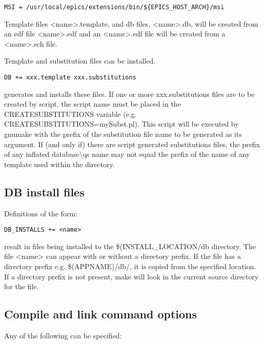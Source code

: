 \begin{verbatim}MSI = /usr/local/epics/extensions/bin/${EPICS_HOST_ARCH}/msi
\end{verbatim}
Template files \textless{}name\textgreater{}.template, and db files, \textless{}name\textgreater{}.db, will be created from an edf file \textless{}name\textgreater{}.edf and an 
\textless{}name\textgreater{}.edf file will be created from a \textless{}name\textgreater{}.sch file.

Template and substitution files can be installed.

\begin{verbatim}DB += xxx.template xxx.substitutions
\end{verbatim}
generates and installs these files. If one or more xxx.substitutions files are to be created by script, the script name must be 
placed in the CREATESUBSTITUTIONS variable (e.g. CREATESUBSTITUTIONS=mySubst.pl). This script will be 
executed by gnumake with the prefix of the substitution file name to be generated as its argument. If (and only if) there 
are script generated substitutions files, the prefix of any inflated database\textbackslash{}qs name may not equal the prefix of the name of 
any template used within the directory.

\subsection{DB install files}

Definitions of the form:

\begin{verbatim}DB_INSTALLS += <name>
\end{verbatim}result in files being installed to the \$(INSTALL\_LOCATION/db directory. The file \textless{}name\textgreater{} can appear with or without a 
directory prefix. If the file has a directory prefix e.g. \$(APPNAME)/db/, it is copied from the specified location. If a 
directory prefix is not present, make will look in the current source directory for the file.

\subsection{Compile and link command options}

Any of the following can be specified:

